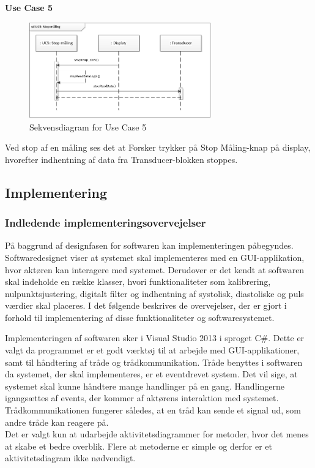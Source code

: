 \textbf{Use Case 5}
\begin{figure}[H]
	\centering
	\includegraphics[width=0.7\textwidth]{Figurer/UC5}
	\caption{Sekvensdiagram for Use Case 5}
	\label{fig:Sekvensdiagram_UC_5}
\end{figure}
Ved stop af en måling ses det at Forsker trykker på Stop Måling-knap på display, hvorefter indhentning af data fra Transducer-blokken stoppes.

\subsection{Implementering}
\subsubsection{Indledende implementeringsovervejelser}
På baggrund af designfasen for softwaren kan implementeringen påbegyndes. Softwaredesignet viser at systemet skal implementeres med en GUI-applikation, hvor aktøren kan interagere med systemet. Derudover er det kendt at softwaren skal indeholde en række klasser, hvori funktionaliteter som kalibrering, nulpunktsjustering, digitalt filter og indhentning af systolisk, diastoliske og puls værdier skal placeres. I det følgende beskrives de overvejelser, der er gjort i forhold til implementering af disse funktionaliteter og softwaresystemet. 

Implementeringen af softwaren sker i Visual Studio 2013 i sproget C\#. Dette er valgt da programmet er et godt værktøj til at arbejde med GUI-applikationer, samt til håndtering af tråde og trådkommunikation. Tråde benyttes i softwaren da systemet, der skal implementeres, er et eventdrevet system. Det vil sige, at systemet skal kunne håndtere mange handlinger på en gang. Handlingerne igangsættes af events, der kommer af aktørens interaktion med systemet. Trådkommunikationen fungerer således, at en tråd kan sende et signal ud, som andre tråde kan reagere på. \\
Det er valgt kun at udarbejde aktivitetsdiagrammer for metoder, hvor det menes at skabe et bedre overblik. Flere at metoderne er simple og derfor er et aktivitetsdiagram ikke nødvendigt. 

